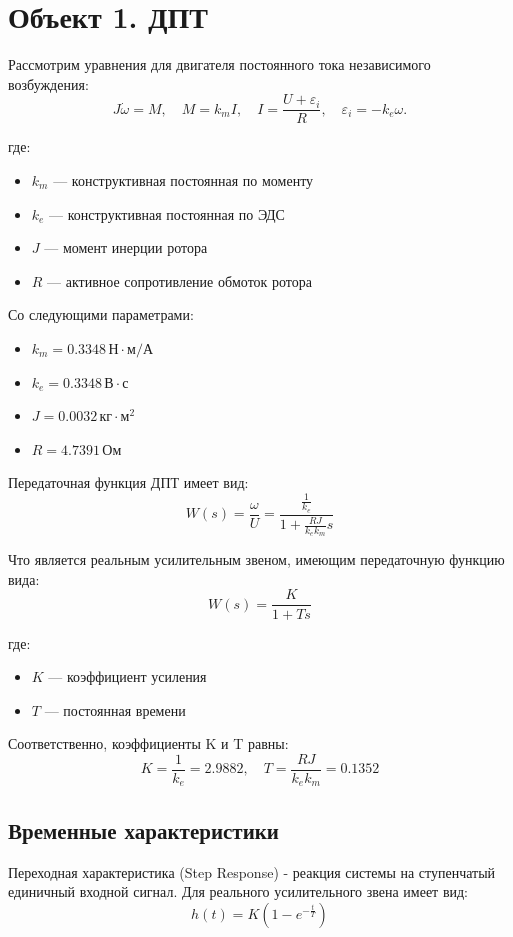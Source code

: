 \chapter{Объект 1. ДПТ}
Рассмотрим уравнения для двигателя постоянного тока независимого возбуждения:
\[
J\dot{\omega} = M, \quad M = k_m I, \quad I = \frac{U + \varepsilon_i}{R}, \quad \varepsilon_i = -k_e \omega.
\]

где:
\begin{itemize}
    \item[] \( k_m \) — конструктивная постоянная по моменту
    \item[] \( k_e \) — конструктивная постоянная по ЭДС
    \item[] \( J \) — момент инерции ротора
    \item[] \( R \) — активное сопротивление обмоток ротора
\end{itemize}

Со следующими параметрами:
\begin{itemize}
    \item[] \( k_m = 0.3348\, \text{Н} \cdot \text{м} / \text{А} \)
    \item[] \( k_e = 0.3348\, \text{В} \cdot \text{с}\)
    \item[] \(J = 0.0032\, \text{кг} \cdot \text{м}^2\)
    \item[] \(R = 4.7391\, \text{Ом}\)
\end{itemize}

Передаточная функция ДПТ имеет вид:
\[
W(s) = \frac{\omega}{U} = \frac{\frac{1}{k_e}}{1+\frac{RJ}{k_e k_m}s}
\]

Что является реальным усилительным звеном, имеющим передаточную функцию вида:
\[
W(s) = \frac{K}{1+Ts}
\]

где:
\begin{itemize}
    \item[] \(K\) — коэффициент усиления
    \item[] \(T\) — постоянная времени
\end{itemize}

Соответственно, коэффициенты K и T равны:
\[
K = \frac{1}{k_e} = 2.9882, \quad T = \frac{RJ}{k_e k_m} = 0.1352
\]

\section{Временные характеристики}

Переходная характеристика (Step Response) - реакция системы на ступенчатый единичный входной сигнал.
Для реального усилительного звена имеет вид:
\[
h(t) = K \left( 1 - e^{-\frac{t}{T}} \right)
\]

